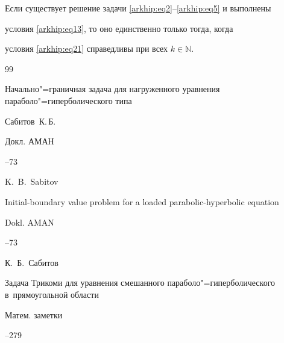 \smallskip



\begin{theorem}

Если существует решение задачи \eqref{arkhip:eq2}--\eqref{arkhip:eq5} и выполнены

условия \eqref{arkhip:eq13}{\rm ,} то оно единственно только тогда{\rm ,} когда

условия  \eqref{arkhip:eq21} справедливы при всех $k\in \mathbb  N.$

\end{theorem}



\begin{thebibliography}{99}




\paper Начально"=граничная задача для нагруженного уравнения параболо"=гиперболического типа

\by Сабитов~К.\,Б.

\jour Докл. АМАН




--73

\misctransl

\by K.~B.~Sabitov

\paper Initial-boundary value problem for a loaded parabolic-hyperbolic equation

\jour Dokl. AMAN




--73






\by К.~Б.~Сабитов

\paper Задача Трикоми для уравнения смешанного параболо"=гиперболического в~прямоугольной области

\jour Матем. заметки




--279




\end{thebibliography}
